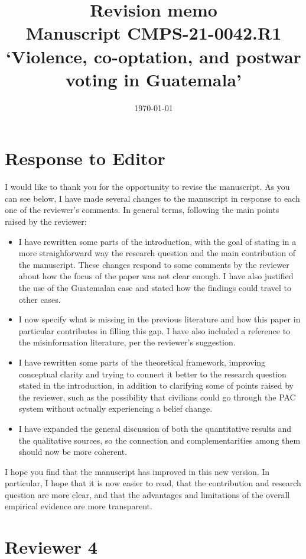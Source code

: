\documentclass[12pt, a4paper, notitlepage]{article}
\title{\large \textbf{Revision memo}\\{\large Manuscript CMPS-21-0042.R1\\`Violence, co-optation, and postwar voting in Guatemala'}}
\author{}
\date{\today}
\begin{document}
\maketitle

\section*{Response to Editor}

I would like to thank you for the opportunity to revise the manuscript. As you can see below, I have made several changes to the manuscript in response to each one of the reviewer's comments. In general terms, following the main points raised by the reviewer:

\begin{itemize}
  \item I have rewritten some parts of the introduction, with the goal of stating in a more straighforward way the research question and the main contribution of the manuscript. These changes respond to some comments by the reviewer about how the focus of the paper was not clear enough. I have also justified the use of the Guatemalan case and stated how the findings could travel to other cases.
  \item I now specify what is missing in the previous literature and how this paper in particular contributes in filling this gap. I have also included a reference to the misinformation literature, per the reviewer's suggestion.
  \item I have rewritten some parts of the theoretical framework, improving conceptual clarity and trying to connect it better to the research question stated in the introduction, in addition to clarifying some of points raised by the reviewer, such as the possibility that civilians could go through the PAC system without actually experiencing a belief change.
  \item I have expanded the general discussion of both the quantitative results and the qualitative sources, so the connection and complementarities among them should now be more coherent.
\end{itemize}

I hope you find that the manuscript has improved in this new version. In particular, I hope that it is now easier to read, that the contribution and research question are more clear, and that the advantages and limitations of the overall empirical evidence are more transparent.


\newpage
\section*{Reviewer 4}
\end{document}
